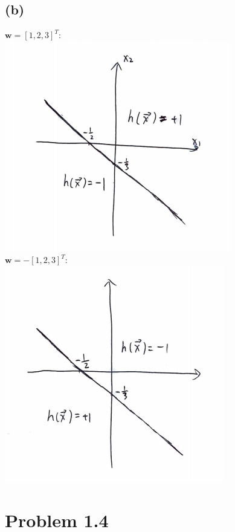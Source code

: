 \documentclass{article}
\begin{document}
	\subsection*{(b)}
		$\mathbf w = [1,2,3]^T$:\\
		\includegraphics[scale=0.8]{p1.2b1.png}\\
		$\mathbf w = -[1,2,3]^T$:\\
		\includegraphics[scale=0.8]{p1.2b2.png}\\
		
	\section*{Problem 1.4}
\end{document}

